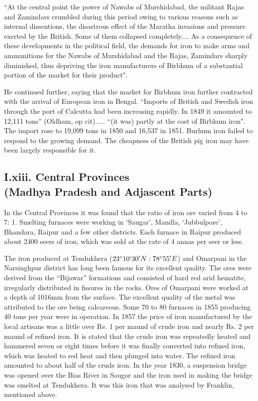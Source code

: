 
{\footnotesize{``At the central point the power of Nawabs of Murshidabad, the militant Rajas and Zamindars crumbled during this period owing to various reasons such as internal dissentions, the disastrous effect of the Maratha invasions and pressure exerted by the British.  Some of them collapsed completely.... As a consequence of these developments in the political field, the demands for iron to make arms and ammunitions for the Nawabs of Murshidabad and the Rajas, Zamindars sharply diminished, thus depriving the iron manufacturers of Birbhum of a substantial portion of the market for their product".}}

He continued further, saying that the market for Birbhum iron further contracted with the arrival of European iron in Bengal.  “Imports of British and Swedish iron through the port of Calcutta had been increasing rapidly.  In 1849 it amounted to 12,111 tons” (Oldham, op cit)..... “(it was) partly at the cost of Birbhum iron".  The import rose to 19,099 tons in 1850 and 16,537 in 1851.  Burhum iron failed to respond to the growing demand.  The cheapness of the British pig iron may have been largely responsible for it.

\vspace{-.3cm}

\subsection*{I.xiii.  Central Provinces\\ (Madhya Pradesh and Adjascent Parts)}\label{subsection-13}

\vspace{-.2cm}

In the Central Provinces it was found that the ratio of iron ore varied from 4 to 7: 1. Smelting furnaces were working in ‘Saugar’, Mandla, `Jubbulpore', Bhandara, Raipur and a few other districts. Each furnace in Raipur produced about 2400 seers of iron, which was sold at the rate of 4 annas per seer or less. 

The iron produced at Tendukhera ($23^\circ 10` 30'N: 78^\circ 55'E$) and Omar\-pani in the Narsinghpur district has long been famous for its excellent quality. The ores were derived from the “Bijawar” formations and consisted of hard red arid hematite, irregularly distributed in fissures in the rocks. Ores of Omarpani were worked at a depth of 1016mm from the surface. The excellent quality of the metal was attributed to the ore being calcareous. Some 70 to 80 furnaces in 1855 producing 40 tons per year were in operation. In 1857 the price of iron manufac\-tured by the local artisans was a little over Re. 1 per maund of crude iron and nearly Rs. 2 per maund of refined iron. It is stated that the crude iron was repeatedly heated and hammered seven or eight times before it was finally converted into refined iron, which was heated to red heat and then plunged into water. The refined iron amounted to about half of the crude iron. In the year 1830, a suspension bridge was opened over the Bias River in Saugor and the iron used in making the bridge was smelted at Tendukhera. It was this iron that was analysed by Franklin, mentioned above.

